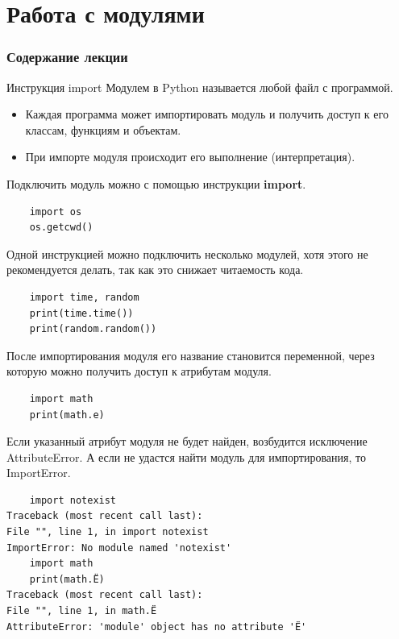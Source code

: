 \documentclass[xcolor=table]{beamer}
\begin{document}
\section{Работа с модулями}

\begin{frame}
  \frametitle{Содержание лекции}
  \tableofcontents[current]
\end{frame}

\begin{frame}[fragile]{Инструкция import}
	Модулем в Python называется любой файл с программой. 	

	\begin{itemize}
		\item Каждая программа может импортировать модуль и получить доступ к его классам, функциям и объектам. 	
		\item При импорте модуля происходит его выполнение (интерпретация).
	\end{itemize}	
	
	Подключить модуль можно с помощью инструкции \textbf{import}.
	\begin{verbatim}
	import os
	os.getcwd()
	\end{verbatim}
	
	Одной инструкцией можно подключить несколько модулей, хотя этого не рекомендуется делать, так как это снижает читаемость кода. 
	\begin{verbatim}
	import time, random
	print(time.time())
	print(random.random())
	\end{verbatim}
\end{frame}

\begin{frame}[fragile]
	После импортирования модуля его название становится переменной, через которую
можно получить доступ к атрибутам модуля. 	
	\begin{verbatim}
	import math
	print(math.e)
	\end{verbatim}
	
	Если указанный атрибут модуля не будет найден, возбудится исключение AttributeError. А если не удастся найти модуль для импортирования, то ImportError. 
	\begin{verbatim}
	import notexist
Traceback (most recent call last):
File "", line 1, in import notexist
ImportError: No module named 'notexist'
	import math
	print(math.Ё)
Traceback (most recent call last):
File "", line 1, in math.Ё
AttributeError: 'module' object has no attribute 'Ё'
	\end{verbatim}
\end{frame}
\end{document}
